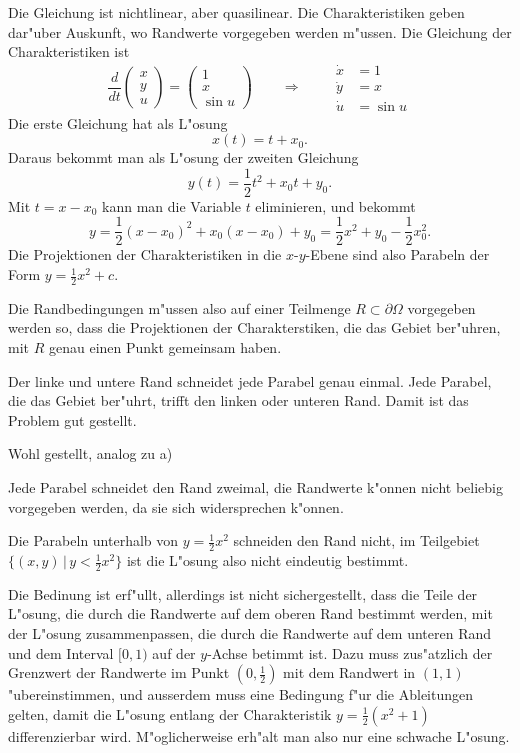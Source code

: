 \begin{loesung}
Die Gleichung ist nichtlinear, aber quasilinear.
Die Charakteristiken geben dar"uber Auskunft, wo Randwerte vorgegeben
werden m"ussen.
Die Gleichung der Charakteristiken ist 
\begin{equation}
\frac{d}{dt}\begin{pmatrix}x\\y\\u\end{pmatrix}
=
\begin{pmatrix}
1\\x\\\sin u
\end{pmatrix}
\qquad
\Rightarrow
\qquad
\begin{aligned}
\dot x &= 1\\
\dot y &= x\\
\dot u &=\sin u
\end{aligned}
\end{equation}
Die erste Gleichung hat als L"osung
\[
x(t) = t+x_0.
\]
Daraus bekommt man als L"osung der zweiten Gleichung
\[
y(t) = \frac12 t^2+x_0t+y_0.
\]
Mit $t=x-x_0$ kann man die Variable $t$ eliminieren, und
bekommt
\[
y=\frac12(x-x_0)^2+x_0(x-x_0)+y_0=\frac12x^2 + y_0-\frac12x_0^2.
\]
Die Projektionen der Charakteristiken in die $x$-$y$-Ebene sind also
Parabeln der Form $y=\frac12x^2+c$.

Die Randbedingungen m"ussen also auf einer Teilmenge $R\subset \partial\Omega$
vorgegeben werden so, dass die Projektionen der Charakterstiken, die das
Gebiet ber"uhren, mit $R$ genau einen Punkt gemeinsam haben. 
\begin{teilaufgaben}
\item Der linke und untere Rand schneidet jede Parabel genau einmal. 
Jede Parabel, die das Gebiet ber"uhrt, trifft den linken oder unteren
Rand. Damit ist das Problem gut gestellt.
\item Wohl gestellt, analog zu a)
\item Jede Parabel schneidet den Rand zweimal, die Randwerte k"onnen nicht
beliebig vorgegeben werden, da sie sich widersprechen k"onnen.
\item Die Parabeln unterhalb von $y=\frac12x^2$ schneiden den Rand
nicht, im Teilgebiet $\{(x,y)\,|\, y<\frac12x^2\}$ ist die L"osung also
nicht eindeutig bestimmt.
\item Die Bedinung ist erf"ullt, allerdings ist nicht sichergestellt,
dass die Teile der L"osung, die durch die Randwerte auf dem oberen 
Rand bestimmt werden, mit der L"osung zusammenpassen, die durch
die Randwerte auf dem unteren Rand und dem Interval $[0,1)$ auf
der $y$-Achse betimmt ist. Dazu muss zus"atzlich der Grenzwert
der Randwerte im Punkt $(0,\frac12)$ mit dem Randwert in $(1,1)$
"ubereinstimmen, und ausserdem muss eine Bedingung f"ur die Ableitungen
gelten, damit die L"osung entlang der Charakteristik $y=\frac12(x^2+1)$
differenzierbar wird. M"oglicherweise erh"alt man also nur eine
schwache L"osung.
\end{teilaufgaben}
\end{loesung}
